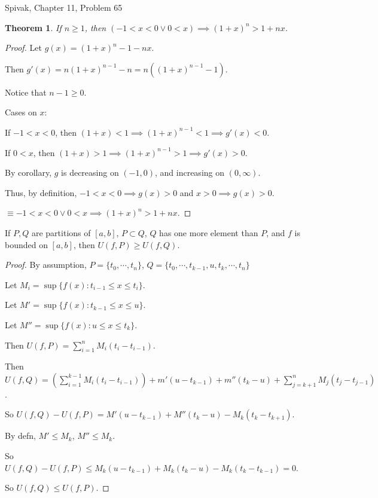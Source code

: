 \documentclass{article} %
\theoremstyle{plain}
\newtheorem*{theorem*}{Theorem}
\theoremstyle{definition}
\begin{document}
\noindent{} Spivak, Chapter 11, Problem 65

\begin{theorem*}
    If $n \geq 1$, then $(-1 < x < 0 \lor 0 < x ) \implies (1+x)^n > 1 + nx$.
\end{theorem*}
\begin{proof} 
    Let $g(x) = (1+x)^n - 1 - nx$.

    Then $g'(x) = n(1+x)^{n-1} - n = n((1+x)^{n-1} - 1)$.

    Notice that $n-1 \geq 0$.

    Cases on $x$:

    If $-1 < x < 0$, then $(1+x) < 1 \implies (1+x)^{n-1} < 1 \implies g'(x) < 0$.

    If $0 < x$, then $(1+x) > 1 \implies (1+x)^{n-1} > 1 \implies g'(x) > 0$.

    By corollary, $g$ is decreasing on $(-1,0)$, and increasing on $(0, \infty)$.

    Thus, by definition, $-1 < x < 0 \implies g(x) > 0$ and $x > 0 \implies g(x) > 0$.

    $\equiv -1 < x < 0 \lor 0 < x \implies (1+x)^n > 1+nx$.
\end{proof}


\noindent{} If $P,Q$ are partitions of $[a,b]$, $P \subset Q$, $Q$ has one more element than $P$, and $f$ is bounded on $[a,b]$, then $U(f,P) \geq U(f,Q)$. 

\begin{proof}
    By assumption, $P = \{ t_0, \cdots, t_n \}$, $Q = \{ t_0, \cdots, t_{k-1}, u, t_k, \cdots, t_n \}$

    Let $M_i = \sup \{ f(x) : t_{i-1} \leq x \leq t_i \}$.

    Let $M' = \sup \{ f(x) : t_{k-1} \leq x \leq u \}$.

    Let $M'' = \sup \{ f(x) : u \leq x \leq t_k \}$.

    Then $U(f,P) = \sum_{i=1}^{n} M_i (t_i - t_{i-1})$.

    Then $U(f,Q) = (\sum_{i=1}^{k-1} M_i (t_i - t_{i-1})) + m'(u - t_{k-1}) + m''(t_k - u) + \sum_{j = k+1}^{n} M_j (t_j - t_{j-1})$.

    So $U(f,Q) - U(f,P) = M'(u - t_{k-1}) + M''(t_k - u) - M_k(t_k - t_{k+1})$.

    By defn, $M' \leq M_k$, $M'' \leq M_k$.

    So $U(f,Q) - U(f,P) \leq M_k(u - t_{k-1}) + M_k(t_k - u) - M_k(t_k - t_{k-1}) = 0$.

    So $U(f,Q) \leq U(f,P)$.
\end{proof}
\end{document}
